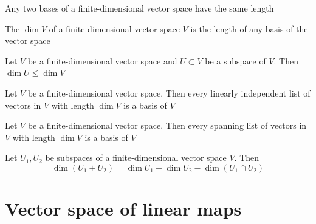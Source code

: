 \documentclass[aspectratio=169]{beamer}
\begin{document}
\begin{frame}
\begin{importanttheorem}
Any two bases of a finite-dimensional vector space have the same length
\end{importanttheorem}

\begin{definition}[Dimension]
The  $\dim V$ of a finite-dimensional vector space $V$ is the length of any basis of the vector space
\end{definition}

\begin{importanttheorem}
Let $V$ be a finite-dimensional vector space and $U\subset V$ be a subspace of $V$. Then $\dim U\leq \dim V$
\end{importanttheorem}
\end{frame}


\begin{frame}
\begin{importanttheorem}
Let $V$ be a finite-dimensional vector space. Then every linearly independent list of vectors in $V$ with length $\dim V$ is a basis of $V$
\end{importanttheorem}

\begin{importanttheorem}
Let $V$ be a finite-dimensional vector space. Then every spanning list of vectors in $V$ with length $\dim V$ is a basis of $V$
\end{importanttheorem}

\begin{importanttheorem}
Let $U_1,U_2$ be subspaces of a finite-dimensional vector space $V$. Then
\[
\dim\left(U_1+U_2\right)=\dim U_1+\dim U_2-\dim\left(U_1\cap U_2\right)
\]
\end{importanttheorem}
\end{frame}




\section{Vector space of linear maps}
\end{document}
